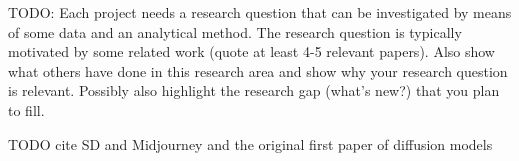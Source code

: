 TODO:
Each project needs a research question that can be
investigated by means of some data and an analytical
method. The research question is typically motivated by
some related work (quote at least 4-5 relevant papers).
Also show what others have done in this research area
and show why your research question is relevant. Possibly
also highlight the research gap (what’s new?) that you plan
to fill.


TODO cite SD and Midjourney and the original first paper of diffusion models


